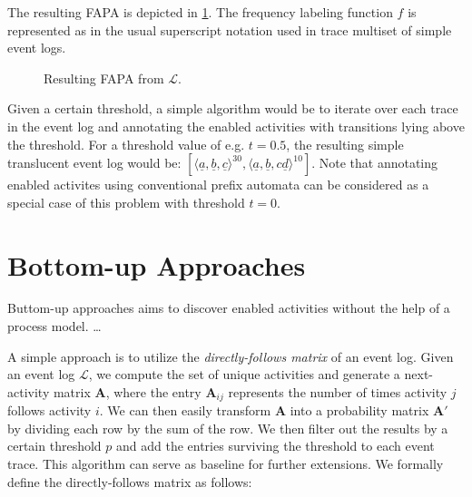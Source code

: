The resulting FAPA is depicted in \ref{fig:fapa}. The frequency labeling function $f$ is represented as in the usual superscript notation used in trace multiset of simple event logs.

\begin{figure}
    \centering
    \caption{Resulting FAPA from $\mathcal{L}$.}
    \label{fig:fapa}
\end{figure}

Given a certain threshold, a simple algorithm would be to iterate over each trace in the event log and annotating the enabled activities with transitions lying above the threshold. For a threshold value of e.g. $t = 0.5$, the resulting simple translucent event log would be: $[\langle \underline{a}, \underline{b}, \underline{c} \rangle^{30}, \langle \underline{a}, \underline{b}, c\underline{d}\rangle^{10}]$. Note that annotating enabled activites using conventional prefix automata can be considered as a special case of this problem with threshold $t = 0$.









\section{Bottom-up Approaches}

Buttom-up approaches aims to discover enabled activities without the help of a process model. \dots

A simple approach is to utilize the \emph{directly-follows matrix} of an event log.
Given an event log $\mathcal{L}$, we compute the set of unique activities and generate a next-activity matrix $\mathbf{A}$, where the entry $\mathbf{A}_{ij}$ represents the number of times activity $j$ follows activity $i$. We can then easily transform $\mathbf{A}$ into a probability matrix $\mathbf{A'}$ by dividing each row by the sum of the row. We then filter out the results by a certain threshold $p$ and add the entries surviving the threshold to each event trace. This algorithm can serve as baseline for further extensions. We formally define the directly-follows matrix as follows:

